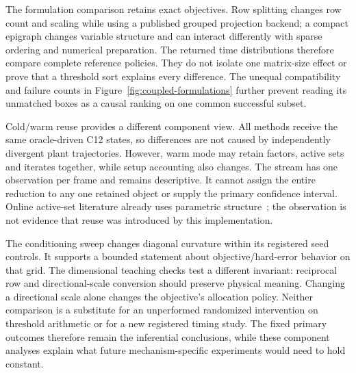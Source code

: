 The formulation comparison retains exact objectives. Row splitting
changes row count and scaling while using a published grouped
projection backend; a compact epigraph changes variable structure
and can interact differently with sparse ordering and numerical
preparation. The returned time distributions therefore compare
complete reference policies. They do not isolate one matrix-size
effect or prove that a threshold sort explains every difference.
The unequal compatibility and failure counts in
Figure~\ref{fig:coupled-formulations} further prevent reading its
unmatched boxes as a causal ranking on one common successful subset.

Cold/warm reuse provides a different component view. All methods
receive the same oracle-driven C12 states, so differences are not
caused by independently divergent plant trajectories. However,
warm mode may retain factors, active sets and iterates together,
while setup accounting also changes. The stream has one observation
per frame and remains descriptive. It cannot assign the entire
reduction to any one retained object or supply the primary
confidence interval. Online active-set literature already uses
parametric structure~\cite{qpOASES}; the observation is not evidence
that reuse was introduced by this implementation.

The conditioning sweep changes diagonal curvature within its
registered seed controls. It supports a bounded statement about
objective/hard-error behavior on that grid. The dimensional
teaching checks test a different invariant: reciprocal row and
directional-scale conversion should preserve physical meaning.
Changing a directional scale alone changes the objective's
allocation policy. Neither comparison is a substitute for an
unperformed randomized intervention on threshold arithmetic or
for a new registered timing study. The fixed primary outcomes
therefore remain the inferential conclusions, while these
component analyses explain what future mechanism-specific
experiments would need to hold constant.
